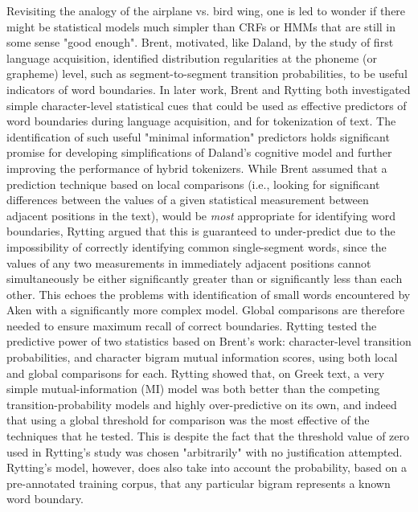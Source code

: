 Revisiting the analogy of the airplane vs. bird wing, one is led to wonder if there might be statistical models much simpler than CRFs or HMMs that are still in some sense "good enough".  Brent, motivated, like Daland, by the study of first language acquisition, identified distribution regularities at the phoneme (or grapheme) level, such as segment-to-segment transition probabilities, to be useful indicators of word boundaries\cite{brent96}. In later work, Brent\cite{brent99} and Rytting\cite{rytting04} both investigated simple character-level statistical cues that could be used as effective predictors of word boundaries during language acquisition, and for tokenization of text. The identification of such useful "minimal information" predictors holds significant promise for developing simplifications of Daland's cognitive model\cite{daland09} and further improving the performance of hybrid tokenizers.
While Brent\cite{brent99} assumed that a prediction technique based on local comparisons (i.e., looking for significant differences between the values of a given statistical measurement between adjacent positions in the text), would be \textit{most} appropriate for identifying word boundaries, Rytting\cite{rytting04} argued that this is guaranteed to under-predict due to the impossibility of correctly identifying common single-segment words, since the values of any two measurements in immediately adjacent positions cannot simultaneously be either significantly greater than or significantly less than each other. This echoes the problems with identification of small words encountered by Aken\cite{aken11} with a significantly more complex model. Global comparisons are therefore needed to ensure maximum recall of correct boundaries.
Rytting\cite{rytting04} tested the predictive power of two statistics based on Brent's work\cite{brent99}: character-level transition probabilities, and character bigram mutual information scores, using both local and global comparisons for each. Rytting \cite{rytting04} showed that, on Greek text, a very simple mutual-information (MI) model was both better than the competing transition-probability models and highly over-predictive on its own, and indeed that using a global threshold for comparison was the most effective of the techniques that he tested. This is despite the fact that the threshold value of zero used in Rytting's study\cite{rytting04} was chosen "arbitrarily" with no justification attempted. Rytting's model, however, does also take into account the probability, based on a pre-annotated training corpus, that any particular bigram represents a known word boundary.

